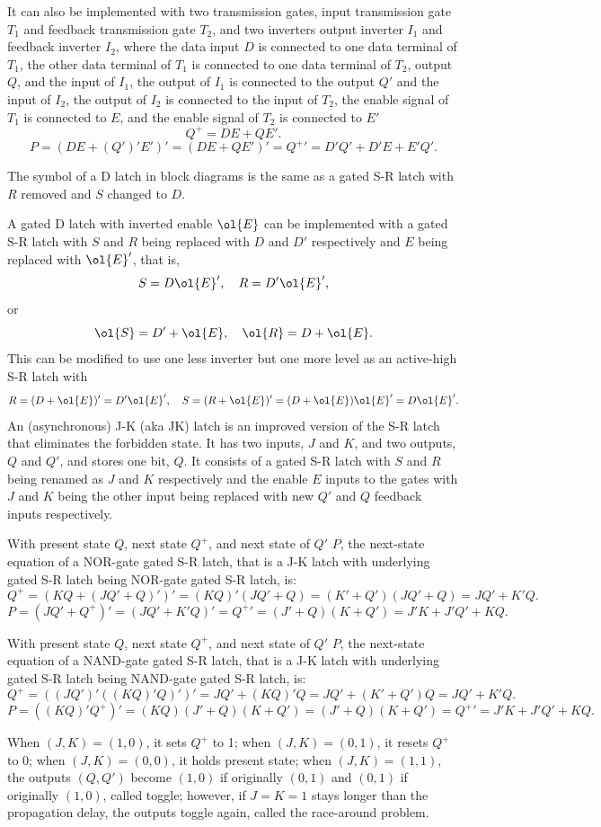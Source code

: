 \documentclass[a4paper,12pt]{report}
\begin{document}
It can also be implemented with two transmission gates, input transmission gate $T_1$ and feedback transmission gate $T_2$, and two inverters output inverter $I_1$ and feedback inverter $I_2$, where the data input $D$ is connected to one data terminal of $T_1$, the other data terminal of $T_1$ is connected to one data terminal of $T_2$, output $Q$, and the input of $I_1$, the output of $I_1$ is connected to the output $Q'$ and the input of $I_2$, the output of $I_2$ is connected to the input of $T_2$, the enable signal of $T_1$ is connected to $E$, and the enable signal of $T_2$ is connected to $E'$
\[Q^+=DE+QE'.\]
\[P=(DE+(Q')'E')'=(DE+QE')'={Q^+}'=D'Q'+D'E+E'Q'.\]

The symbol of a D latch in block diagrams is the same as a gated S-R latch with $R$ removed and $S$ changed to $D$.

A gated D latch with inverted enable $\ol{E}$ can be implemented with a gated S-R latch with $S$ and $R$ being replaced with $D$ and $D'$ respectively and $E$ being replaced with $\ol{E}'$, that is,
\[S=D\ol{E}',\quad R=D'\ol{E}',\]
or
\[\ol{S}=D'+\ol{E},\quad\ol{R}=D+\ol{E}.\]
This can be modified to use one less inverter but one more level as an active-high S-R latch with
\[R=(D+\ol{E})'=D'\ol{E}',\quad S=(R+\ol{E})'=(D+\ol{E})\ol{E}'=D\ol{E}'.\]
An (asynchronous) J-K (aka JK) latch is an improved version of the S-R latch that eliminates the forbidden state. It has two inputs, $J$ and $K$, and two outputs, $Q$ and $Q'$, and stores one bit, $Q$. It consists of a gated S-R latch with $S$ and $R$ being renamed as $J$ and $K$ respectively and the enable $E$ inputs to the gates with $J$ and $K$ being the other input being replaced with new $Q'$ and $Q$ feedback inputs respectively.

With present state $Q$, next state $Q^+$, and next state of $Q'$ $P$, the next-state equation of a NOR-gate gated S-R latch, that is a J-K latch with underlying gated S-R latch being NOR-gate gated S-R latch, is:
\[Q^+=(KQ+(JQ'+Q)')'=(KQ)'(JQ'+Q)=(K'+Q')(JQ'+Q)=JQ'+K'Q.\]
\[P=(JQ'+Q^+)'=(JQ'+K'Q)'={Q^+}'=(J'+Q)(K+Q')=J'K+J'Q'+KQ.\]

With present state $Q$, next state $Q^+$, and next state of $Q'$ $P$, the next-state equation of a NAND-gate gated S-R latch, that is a J-K latch with underlying gated S-R latch being NAND-gate gated S-R latch, is:
\[Q^+=((JQ')'((KQ)'Q)')'=JQ'+(KQ)'Q=JQ'+(K'+Q')Q=JQ'+K'Q.\]
\[P=((KQ)'Q^+)'=(KQ)(J'+Q)(K+Q')=(J'+Q)(K+Q')={Q^+}'=J'K+J'Q'+KQ.\]

When $(J,K)=(1,0)$, it sets $Q^+$ to 1; when $(J,K)=(0,1)$, it resets $Q^+$ to 0; when $(J,K)=(0,0)$, it holds present state; when $(J,K)=(1,1)$, the outputs $(Q,Q')$ become $(1,0)$ if originally $(0,1)$ and $(0,1)$ if originally $(1,0)$, called toggle; however, if $J=K=1$ stays longer than the propagation delay, the outputs toggle again, called the race-around problem.
\end{document}
